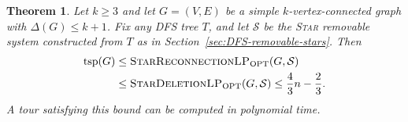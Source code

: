 \documentclass[11pt]{amsart}
\newcommand{\1}{\mathbbm{1}}
\newcommand{\LPone}{\textsc{StarDeletionLP}}
\newcommand{\LPtwo}{\textsc{StarReconnectionLP}}
\newtheorem{theorem}{Theorem}[section]
\begin{document}
\begin{theorem}
\label{thm:k-connected-four-thirds}
Let $k\ge3$ and let $G=(V,E)$ be a simple $k$-vertex-connected graph
with $\Delta(G)\le k+1$. Fix any DFS tree $T$, and let
$\mathcal S$ be the \textsc{Star} removable system constructed from $T$
as in Section~\ref{sec:DFS-removable-stars}. Then
\begin{equation}
\label{eq:k-connected-four-thirds}
 \begin{aligned}
 \operatorname{tsp}(G)
 &\le \text{\LPtwo}_{\mathrm{OPT}}(G,\mathcal S)\\
 &\le \text{\LPone}_{\mathrm{OPT}}(G,\mathcal S)
 \le \frac43n-\frac23.
 \end{aligned}
\end{equation}
A tour satisfying this bound can be computed in polynomial time.
\end{theorem}
\end{document}
